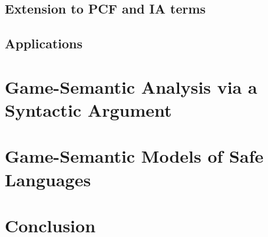     \section{Extension to PCF and IA terms}
    


    \section{Applications}

\chapter{Game-Semantic Analysis via a Syntactic Argument}
    \label{chap:syntactic_gamesem}
    
    \clearpage
    


\chapter{Game-Semantic Models of Safe Languages}
    \label{chap:model}
    



\chapter{Conclusion}
    \label{chap:conclusion}
    





\printindex

     {\protect{}}


